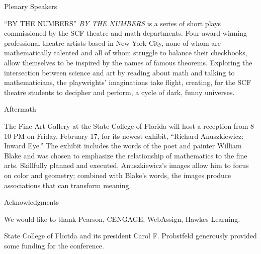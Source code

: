 \documentclass[final,hyperref={pdfpagelabels=false},12pt]{beamer}
\begin{document}
\begin{frame}[t]
\begin{columns}[t]
\begin{column}{.465\textwidth}
\begin{block}{Plenary Speakers}
\end{block}


\begin{block}{``BY THE NUMBERS''}
{\emph{BY THE NUMBERS}} is a series of short plays commissioned by the SCF theatre and math departments. Four award-winning professional theatre artists based in New York City, none of whom are mathematically talented and all of whom struggle to balance their checkbooks, allow themselves to be inspired by the names of famous theorems. Exploring the intersection between science and art by reading about math and talking to mathematicians, the playwrights' imaginations take flight, creating, for the SCF theatre students to decipher and perform, a cycle of dark, funny universes.


\end{block}


\begin{block}{Aftermath}
        
The Fine Art Gallery at the State College of Florida will host a reception from 8-10 PM on Friday, February 17, for its newest exhibit, ``Richard Anuszkiewicz: Inward Eye.'' The exhibit includes the words of the poet 	and painter William Blake and was chosen to emphasize the relationship of mathematics to the fine arts. 	Skillfully planned and executed, Anuszkiewicz's images allow him to focus on color and geometry; combined 	with Blake's words, the images produce associations that can transform meaning.

\end{block}


\begin{block}{Acknowledgments}

We would like to thank Pearson, CENGAGE, WebAssign, Hawkes Learning.

State College of Florida  and its president Carol F. Probstfeld  
 generously provided some funding for the conference.



\end{block}
\end{column}
\end{columns}
\end{frame}
\end{document}
